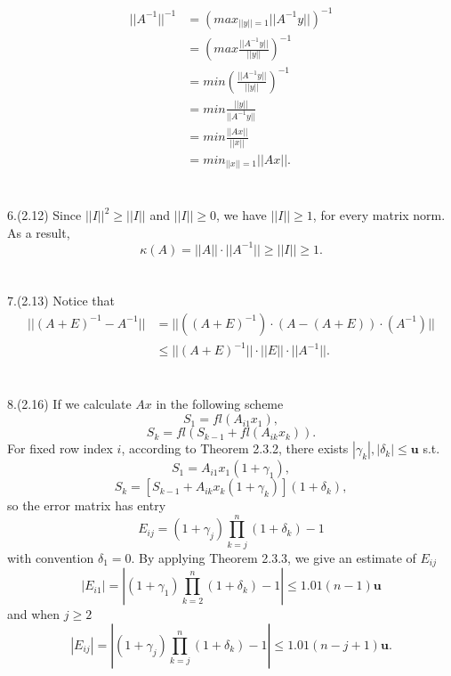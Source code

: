 \documentclass[11pt]{article}
\begin{document}
\begin{align*}
||A^{-1}||^{-1} &= \left(max_{||y||=1} ||A^{-1}y||\right)^{-1} \\
				&= \left(max \frac{||A^{-1}y||}{||y||}\right)^{-1} \\
				&= min \left(\frac{||A^{-1}y||}{||y||}\right)^{-1} \\
				&= min \frac{||y||}{||A^{-1}y||} \\
				&= min \frac{||Ax||}{||x||}\\
				&= min_{||x||=1} ||Ax||.
\end{align*}
\\\\
6.(2.12) Since $||I||^2 \ge ||I||$ and $||I|| \ge 0$, we have $||I|| \ge 1$, for every matrix norm.
As a result, $$\kappa(A) = ||A||\cdot||A^{-1}|| \ge ||I|| \ge 1.$$
\\\\
7.(2.13) Notice that
\begin{align*}
||(A+E)^{-1}-A^{-1}|| &= ||\left((A+E)^{-1}\right) \cdot \left(A-(A+E)\right) \cdot \left(A^{-1}\right)|| \\
&\le ||(A+E)^{-1}|| \cdot|| E || \cdot ||A^{-1}|| .
\end{align*}
\\\\
8.(2.16) If we calculate $Ax$ in the following scheme
$$S_1=fl(A_{i1}x_1),$$
$$S_k=fl\left(S_{k-1}+fl(A_{ik}x_k)\right).$$
For fixed row index $i$, according to Theorem 2.3.2, there exists $|\gamma_k|, |\delta_k| \le \mathbf{u}$ s.t.
$$S_1=A_{i1}x_1(1+\gamma_1),$$
$$S_k=[S_{k-1}+A_{ik}x_k(1+\gamma_k)](1+\delta_k),$$
so the error matrix has entry
$$E_{ij}=(1+\gamma_j)\prod_{k=j}^n(1+\delta_k)-1$$
with convention $\delta_1=0$. 
By applying Theorem 2.3.3, we give an estimate of $E_{ij}$
$$|E_{i1}| = |(1+\gamma_1)\prod_{k=2}^n(1+\delta_k)-1| \le 1.01 (n-1) \mathbf{u}$$
and when $j \ge 2$
$$|E_{ij}| = |(1+\gamma_j)\prod_{k=j}^n(1+\delta_k)-1| \le 1.01 (n-j+1) \mathbf{u}.$$
\end{document}
